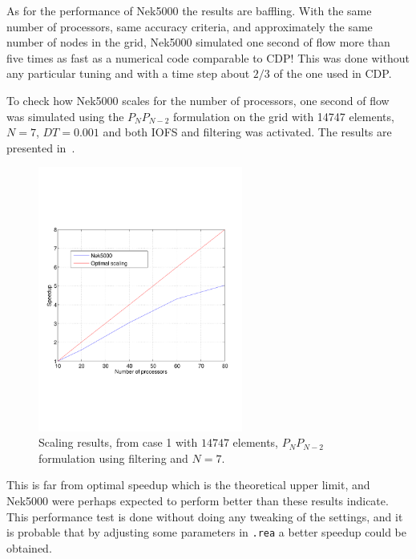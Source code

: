 \newpage
As for the performance of Nek5000 the results are baffling. With the same number of processors,
same accuracy criteria, and approximately the same number of nodes in the grid, Nek5000 simulated
one second of flow more than five times as fast as a numerical code comparable to CDP! 
This was done without any particular tuning and with a time step about $2/3$ of the one used in 
CDP. 

To check how Nek5000 scales for the number of processors, one second of flow was 
simulated using the $P_NP_{N-2}$ formulation on the grid with 14747 elements,
$N=7$, $DT = 0.001$ and both IOFS and filtering was activated. The results 
are presented in~.
%
\begin{figure}[h!]
	\centerline{
        \includegraphics[trim=0.5cm 4cm 0.5cm 4cm, width=0.6\textwidth]{Figures/scalresults.pdf}}
        \caption{Scaling results, from case 1 with $14747$ elements, $P_NP_{N-2}$ formulation using filtering and $N=7$.}
	\label{fig:perfgas}
\end{figure}
%

This is far from optimal speedup which is the theoretical upper limit, and Nek5000 were perhaps expected to perform 
better than these results indicate. This performance test is done without doing any tweaking of the settings, and 
it is probable that by adjusting some parameters in \verb|.rea| a better speedup could be obtained. 




